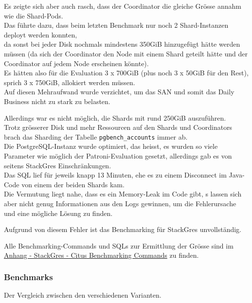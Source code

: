 \begin{flushleft}
    Es zeigte sich aber auch rasch, dass der Coordinator die gleiche Grösse annahm wie die Shard-Pods.\\
    Das führte dazu, dass beim letzten Benchmark nur noch 2 Shard-Instanzen deployt werden konnten,\\
    da sonst bei jeder Disk nochmals mindestens 350GiB hinzugefügt hätte werden müssen (da sich der Coordinator den Node mit einem Shard geteilt hätte und der Coordinator auf jedem Node erscheinen könnte).\\
    Es hätten also für die Evaluation 3 x 700GiB (plus noch 3 x 50GiB für den Rest), sprich 3 x 750GiB, allokiert werden müssen.\\
    Auf diesen Mehraufwand wurde verzichtet, um das \Gls{SAN} und somit das Daily Business nicht zu stark zu belasten.
\end{flushleft}
\begin{flushleft}
    Allerdings war es nicht möglich, die Shards mit rund 250GiB auszuführen.\\
    Trotz grösserer Disk und mehr Ressourcen auf den Shards und Coordinators brach das Sharding der Tabelle \texttt{pgbench\_accounts} immer ab.\\
    Die PostgreSQL-Instanz wurde optimiert, das heisst, es wurden so viele Parameter wie möglich der Patroni-Evaluation gesetzt, allerdings gab es von seitens StackGres Einschränkungen.\\
    Das SQL lief für jeweils knapp 13 Minuten, ehe es zu einem Disconnect im Java-Code von einem der beiden Shards kam.\\
    Die Vermutung liegt nahe, dass es ein Memory-Leak im Code gibt, s lassen sich aber nicht genug Informationen aus den Logs gewinnen, um die Fehlerursache und eine mögliche Lösung zu finden.
    \begin{warning}
        Aufgrund von diesem Fehler ist das Benchmarking für StackGres unvollständig.
    \end{warning}
\end{flushleft}
\begin{flushleft}
    Alle Benchmarking-Commands und SQLs zur Ermittlung der Grösse sind im \hyperref[subsec:stackgres_citus_benchmarking_commands]{Anhang - StackGres - Citus Benchmarking Commands} zu finden.
    \subsubsection{Benchmarks}
    Der Vergleich zwischen den verschiedenen Varianten.\\
\end{flushleft}
